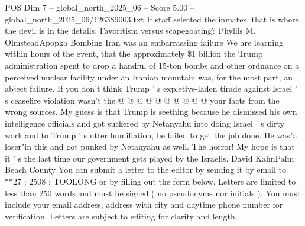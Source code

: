 \begin{textsample}{POS Dim 7 – global\_north\_2025\_06 – Score 5.00 – global\_north\_2025\_06/126389003.txt}
If staff selected the inmates, that is where the devil is in the details.
Favoritism versus scapegoating?
Phyllis M.
OlmsteadApopka Bombing Iran was an embarrassing failure We are learning within hours of the event, that the approximately \$1 billion the Trump administration spent to drop a handful of 15-ton bombs and other ordnance on a perceived nuclear facility under an Iranian mountain was, for the most part, an abject failure.
If you don't think Trump ' s expletive-laden tirade against Israel ' s ceasefire violation wasn't the @ @ @ @ @ @ @ @ @ @ your facts from the wrong sources.
My guess is that Trump is seething because he dismissed his own intelligence officials and got suckered by Netanyahu into doing Israel ' s dirty work and to Trump ' s utter humiliation, he failed to get the job done.
He was"a loser"in this and got punked by Netanyahu as well.
The horror!
My hope is that it ' s the last time our government gets played by the Israelis.
David KahnPalm Beach County You can submit a letter to the editor by sending it by email to **27 ; 2508 ; TOOLONG or by filling out the form below.
Letters are limited to less than 250 words and must be signed ( no pseudonyms nor initials ).
You must include your email address, address with city and daytime phone number for verification.
Letters are subject to editing for clarity and length.

\end{textsample}
